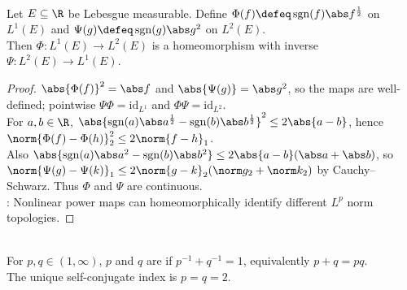 \begin{example} \label{ex:mazur-l1-l2-homeomorphism} \\
Let $E\subseteq\R$ be Lebesgue measurable. Define $\Phi(f)\defeq\operatorname{sgn}(f)\abs f^{\frac{1}{2}}$ on $L^1(E)$ and $\Psi(g)\defeq\operatorname{sgn}(g)\abs g^2$ on $L^2(E)$.\\
Then $\Phi:L^1(E)\to L^2(E)$ is a homeomorphism with inverse $\Psi:L^2(E)\to L^1(E)$.
\begin{proof}
$\abs{\Phi(f)}^2=\abs f$ and $\abs{\Psi(g)}=\abs g^2$, so the maps are well-defined; pointwise $\Psi\Phi=\mathrm{id}_{L^1}$ and $\Phi\Psi=\mathrm{id}_{L^2}$.\\
For $a,b\in\R$, $\abs{\operatorname{sgn}(a)\abs a^{\frac{1}{2}}-\operatorname{sgn}(b)\abs b^{\frac{1}{2}}}^2\leq2\abs{a-b}$, hence $\norm{\Phi(f)-\Phi(h)}_2^2\leq2\norm{f-h}_1$.\\
Also $\abs{\operatorname{sgn}(a)\abs a^2-\operatorname{sgn}(b)\abs b^2}\leq2\abs{a-b}(\abs a+\abs b)$, so $\norm{\Psi(g)-\Psi(k)}_1\leq2\norm{g-k}_2(\norm g_2+\norm k_2)$ by Cauchy--Schwarz. Thus $\Phi$ and $\Psi$ are continuous.\\
: Nonlinear power maps can homeomorphically identify different $L^p$ norm topologies.
\end{proof}
\end{example}

\begin{definition} \label{def:conjugate-indices-lp} \\
For $p,q\in(1,\infty)$, $p$ and $q$ are  if $p^{-1}+q^{-1}=1$, equivalently $p+q=pq$.\\
The unique self-conjugate index is $p=q=2$.
\end{definition}

